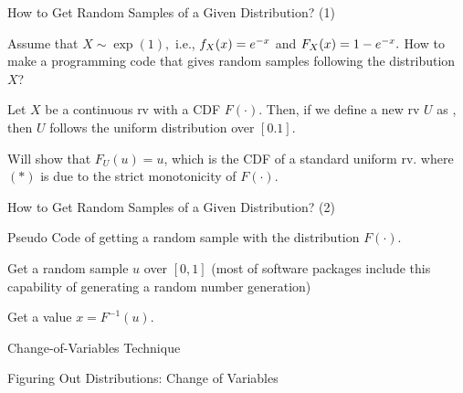 \documentclass[handout,fleqn,aspectratio=169]{beamer}
\begin{document}
\begin{frame}{How to Get Random Samples of a Given Distribution? (1)}

\plitemsep 0.1in

\bci 

\item Assume that $X \sim \exp(1),$ i.e., $f_X(x) = e^{-x}$ and $F_X(x) = 1-e^{-x}.$ How to make a programming code that gives random samples following the distribution $X$? 
\item \thm {} Let $X$ be a continuous rv with a  CDF $F(\cdot)$. Then, if we define a new rv $U$ as , then $U$ follows the uniform distribution over $[0.1].$

\item {} Will show that $F_U(u) = u$, which is the CDF of a standard uniform rv. 
where $(*)$ is due to the strict monotonicity of $F(\cdot).$
\eci
\end{frame}

\begin{frame}{How to Get Random Samples of a Given Distribution? (2)}

Pseudo Code of getting a random sample with the distribution $F(\cdot).$

\plitemsep 0.1in

\bce[\bf Step 1.] 

\item Get a random sample $u$ over $[0,1]$ (most of software packages include this capability of generating a random number generation)

\item Get a value $x = F^{-1}(u).$
\ece
\end{frame}

\begin{frame}{Change-of-Variables Technique}

\plitemsep 0.1in

\bci 

\item 

\eci
\end{frame}

\begin{frame}{Figuring Out Distributions: Change of Variables}

\plitemsep 0.1in

\bci 

\item 

\eci
\end{frame}
\end{document}
